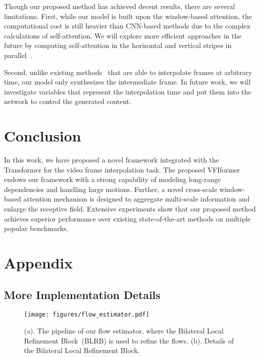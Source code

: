\documentclass[10pt,twocolumn,letterpaper]{article}
\begin{document}
	Though our proposed method has achieved decent results, there are several limitations. First, while our model is built upon the window-based attention, the computational cost is still heavier than CNN-based methods due to the complex calculations of self-attention. We will explore more efficient approaches in the future by computing self-attention in the horizontal and vertical stripes in parallel~\cite{dong2021cswin}. 
	
	Second, unlike existing methods~\cite{jiang2018super,asymmetric} that are able to interpolate frames at arbitrary time, our model only synthesizes the intermediate frame. In future work, we will investigate variables that represent the interpolation time and put them into the network to control the generated content.
	
	
	\section{Conclusion}
	
	In this work, we have proposed a novel framework integrated with the Transformer for the video frame interpolation task. The proposed VFIformer endows our framework with a strong capability of modeling long-range dependencies and handling large motions. Further, a novel cross-scale window-based attention mechanism is designed to aggregate multi-scale information and enlarge the receptive field. Extensive experiments show that our proposed method achieves superior performance over existing state-of-the-art methods on multiple popular benchmarks. 
	
	
	
	
	
{\small
		
		
	}


\clearpage
	\newpage
	
	\appendix
	
	\section{Appendix}
	
	\subsection{More Implementation Details}
	\label{sec:imp}
	
	
	\begin{figure}[h]
		\begin{center}
\texttt{[image: figures/flow\_estimator.pdf]}
		\end{center}
		\vspace{-0.1in}
		\caption{(a). The pipeline of our flow estimator, where the Bilateral Local Refinement Block~(BLRB) is used to refine the flows. (b). Details of the Bilateral Local Refinement Block.}
		\label{fig:flow_estimator}
\end{figure}
	
\end{document}
